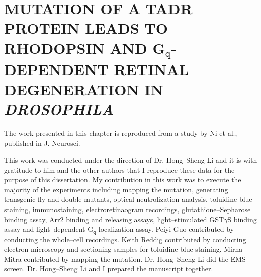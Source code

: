 \chapter[A TADR PROTEIN MUTATION]{MUTATION OF A TADR PROTEIN LEADS TO RHODOPSIN AND G$_{\texttt{q}}$-DEPENDENT RETINAL DEGENERATION IN \textit{DROSOPHILA}}                     %

The work presented in this chapter is reproduced from a study by Ni et al., published in J. Neurosci. \cite{Ni2008}

This work was conducted under the direction of Dr. Hong--Sheng Li and it is with gratitude to him and the other authors that I reproduce these data for the purpose of this dissertation. My contribution in this work was to execute the majority of the experiments including mapping the mutation, generating transgenic fly and double mutants, optical neutrolization analysis, toluidine blue staining, immunostaining, electroretinaogram recordings, glutathione--Sepharose binding assay, Arr2 binding and releasing assays, light--stimulated GST$\gamma$S binding assay and light--dependent G$_{\texttt{q}}$ localization assay.  Peiyi Guo contributed by conducting the whole--cell recordings. Keith Reddig contributed by conducting electron microscopy and sectioning samples for toluidine blue staining. Mirna Mitra contributed by mapping the mutation. Dr. Hong--Sheng Li did the EMS screen. Dr. Hong--Sheng Li and I prepared the manuscript together.
\clearpage


